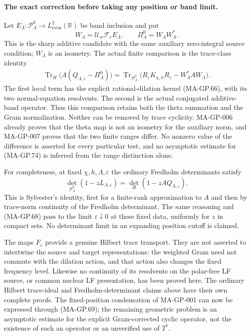 \paragraph{The exact correction before taking any position or band limit.}
Let $E_\Lambda:\mathcal P_\Lambda^0\to L^2_{\mathrm{even}}(\mathbb R)$
be band inclusion and put
\[
 W_\Lambda=\mathcal U_w\mathcal F_eE_\Lambda,
 \qquad \Pi_\Lambda^0=W_\Lambda W_\Lambda^*.
 \tag{MA-GP.73}
\]
This is the sharp additive candidate with the same auxiliary
zero-integral source condition; $W_\Lambda$ is an isometry.
The actual finite comparison is the trace-class identity
\[
 \begin{split}
 \operatorname{Tr}_H\bigl(A(Q_{\Lambda,\varepsilon}-\Pi_\Lambda^0)\bigr)
   =\operatorname{Tr}_{\mathcal P_\Lambda^0}\bigl(
          R_\varepsilon K_{\chi,h}R_\varepsilon
                                  -W_\Lambda^*AW_\Lambda\bigr).
 \end{split}
 \tag{MA-GP.74}
\]
The first local term has the explicit rational-dilation kernel
(MA-GP.66), with its two normal-equation resolvents.
The second is the actual conjugated additive-band operator.
Thus this comparison retains both the theta summation and
the Gram normalization.  Neither can be removed by trace
cyclicity.  MA-GP-006 already proves that the theta map is
not an isometry for the auxiliary norm, and MA-GP-007
proves that the two finite ranges differ.
No nonzero value of the difference is asserted for every
particular test, and no asymptotic estimate for (MA-GP.74)
is inferred from the range distinction alone.

For completeness, at fixed $\chi,h,\Lambda,\varepsilon$
the ordinary Fredholm determinants satisfy
\[
 \det_{\mathcal P_\Lambda^0}(1-zL_{\Lambda,\varepsilon})
       =\det_H(1-zAQ_{\Lambda,\varepsilon}).
 \tag{MA-GP.75}
\]
This is Sylvester's identity, first for a finite-rank
approximation to $A$ and then by trace-norm continuity of
the Fredholm determinant.  The same reasoning and
(MA-GP.68) pass to the limit $\varepsilon\downarrow0$
at these fixed data, uniformly for $z$ in compact sets.
No determinant limit in an expanding position cutoff is
claimed.

The maps $F_\varepsilon$ provide a genuine Hilbert trace
transport.  They are not asserted to intertwine the source
and target representations: the weighted Gram need not
commute with the dilation action, and that action also
changes the fixed frequency level.  Likewise no continuity
of its resolvents on the polar-free LF source, or common
nuclear LF presentation, has been proved here.
The ordinary Hilbert trace-ideal and Fredholm-determinant
claims above have their own complete proofs.
The fixed-position condensation of MA-GP-001 can now be
expressed through (MA-GP.69); the remaining geometric
problem is an asymptotic estimate for the explicit
Gram-corrected cyclic operator, not the existence of such
an operator or an unverified use of $T^*$.
